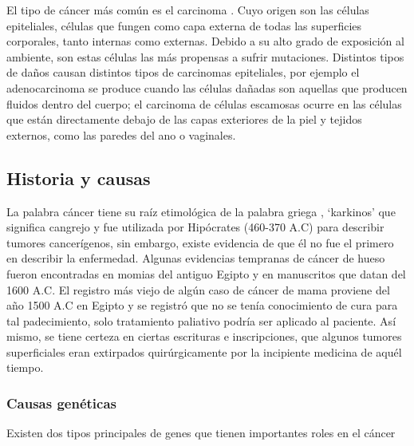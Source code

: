El tipo de cáncer más común es el carcinoma . Cuyo origen son
las células epiteliales, células que fungen como capa externa de todas las
superficies corporales, tanto internas como externas. Debido a su alto grado de
exposición al ambiente, son estas células las más propensas a sufrir mutaciones.
Distintos tipos de daños causan distintos tipos de carcinomas epiteliales, por
ejemplo el adenocarcinoma se produce cuando las células dañadas son aquellas que
producen fluidos dentro del cuerpo; el carcinoma de células escamosas ocurre en
las células que están directamente debajo de las capas exteriores de la piel y
tejidos externos, como las paredes del ano o
vaginales.~\cite{NationalCancerInstitute}

\subsection{Historia y causas}

La palabra cáncer tiene su raíz etimológica de la palabra griega
\textkappa\textalpha\textrho\textkappa\textiota\textnu\textomikron\textvarsigma,
`karkinos' que significa cangrejo y fue utilizada por Hipócrates (460-370 A.C)
para describir tumores cancerígenos, sin embargo, existe evidencia de que él no
fue el primero en describir la enfermedad. Algunas evidencias tempranas de
cáncer de hueso fueron encontradas en momias del antiguo Egipto y en manuscritos
que datan del 1600 A.C. El registro más viejo de algún caso de cáncer de mama
proviene del año 1500 A.C en Egipto y se registró que no se tenía conocimiento
de cura para tal padecimiento, solo tratamiento paliativo podría ser aplicado al
paciente. Así mismo, se tiene certeza en ciertas escrituras e inscripciones, que
algunos tumores superficiales eran extirpados quirúrgicamente por la incipiente
medicina de aquél tiempo.~\cite{AmericanCancerSocietyb}

\subsubsection{Causas genéticas}

Existen dos tipos principales de genes que tienen importantes roles en el cáncer

